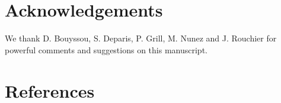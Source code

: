 \documentclass[preprint, french, english, 11pt, authoryear]{elsarticle}%
\begin{document}
\setcounter{secnumdepth}{0}
\section{Acknowledgements}
We thank D. Bouyssou, S. Deparis, P. Grill, M. Nunez and J. Rouchier for powerful comments and suggestions on this manuscript.

\section{References}

\end{document}
